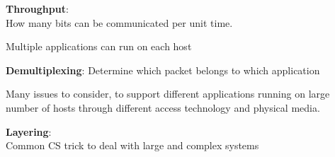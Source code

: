 \begin{cf}{
\textbf{Throughput}:\\ How many bits can be communicated per unit time.
}
\end{cf}

\begin{frame}[t]\normalsize
	Multiple applications can run on each host
\end{frame}

\begin{cf}{
\textbf{Demultiplexing}: Determine which packet belongs to which application
}
\end{cf}

\begin{frame}\begin{center}\normalsize
Many issues to consider, to support different applications running on large number of hosts through different access technology and physical media.
\end{center}\end{frame}

\begin{frame}[plain]
\end{frame}

\begin{frame}\begin{center}\large
\textbf{Layering}:\\Common CS trick to deal with large and complex systems
\end{center}\end{frame}

